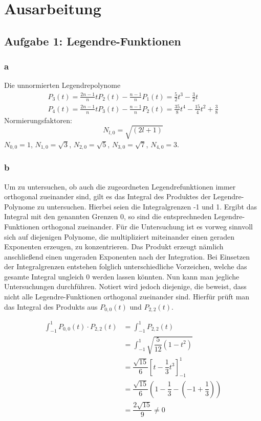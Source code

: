 \chapter{Ausarbeitung}
\section{Aufgabe 1: Legendre-Funktionen}
\subsection{a}
Die unnormierten Legendrepolynome
\begin{gather}
	P_3(t) = \frac{2n-1}{n} t P_2(t) - \frac{n-1}{n}P_1(t) = \frac{5}{2}t^3-\frac{3}{2}t \\
	P_4(t) = \frac{2n-1}{n} t P_3(t) - \frac{n-1}{n}P_2(t) = \frac{35}{8}t^4 - \frac{15}{4}t^2 + \frac{3}{8}
\end{gather}
Normierungsfaktoren:
\begin{equation}
	N_{l,0} = \sqrt{(2l+1)}	
\end{equation}
$N_{0,0} = 1$, $N_{1,0} = \sqrt{3}$, $N_{2,0} = \sqrt{5}$, $N_{3,0} = \sqrt{7}$, $N_{4,0} = 3$.
\subsection{b}
Um zu untersuchen, ob auch die zugeordneten Legendrefunktionen immer orthogonal zueinander sind, gilt es das Integral des Produktes der Legendre-Polynome zu untersuchen. Hierbei seien die Integralgrenzen -1 und 1. Ergibt das Integral mit den genannten Grenzen 0, so sind die entsprechneden Legendre-Funktionen orthogonal zueinander. Für die Untersuchung ist es vorweg sinnvoll sich auf diejenigen Polynome, die multipliziert miteinander einen geraden Exponenten erzeugen, zu konzentrieren. Das Produkt erzeugt nämlich anschließend einen ungeraden Exponenten nach der Integration. Bei Einsetzen der Integralgrenzen entstehen folglich unterschiedliche Vorzeichen, welche das gesamte Integral ungleich 0 werden lassen könnten. Nun kann man jegliche Untersuchungen durchführen. Notiert wird jedoch diejenige, die beweist, dass nicht alle Legendre-Funktionen orthogonal zueinander sind. Hierfür prüft man das Integral des Produkts aus $P_{0,0}(t)$ und $P_{2,2}(t)$.

\begin{align}
\int_{-1}^{1} P_{0,0}(t) \cdot P_{2,2}(t) &= \int_{-1}^{1} P_{2,2}(t) \\
&= \int_{-1}^{1} \sqrt{\dfrac{5}{12}(1-t^2)} \\
&= \dfrac{\sqrt{15}}{6} \left[ t- \dfrac{1}{3}t^3 \right]_{-1}^1 \\
&= \dfrac{\sqrt{15}}{6} \left( 1- \dfrac{1}{3} - \left(-1+ \dfrac{1}{3}\right) \right) \\
&= \dfrac{2\sqrt{15}}{9} \neq 0
\end{align}   

